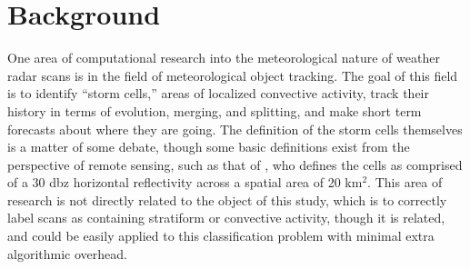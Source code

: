 \chapter{Background}
\label{sec:background}

One area of computational research into the meteorological nature of weather radar scans is in the field of meteorological object tracking. 
The goal of this field is to identify “storm cells,” areas of localized convective activity, track their history in terms of evolution, merging, and splitting, and make short term forecasts about where they are going. 
The definition of the storm cells themselves is a matter of some debate, though some basic definitions exist from the perspective of remote sensing, such as that of \cite{lakshmanan2010objective}, who defines the cells as comprised of a 30 dbz horizontal reflectivity across a spatial area of 20 km$^2$. 
This area of research is not directly related to the object of this study, which is to correctly label scans as containing stratiform or convective activity, though it is related, and could be easily applied to this classification problem with minimal extra algorithmic overhead.

